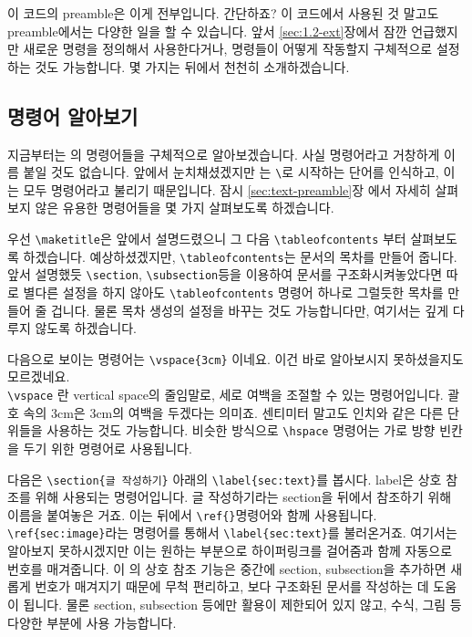 이 코드의 preamble은 이게 전부입니다. 간단하죠?
이 코드에서 사용된 것 말고도  preamble에서는 다양한 일을 할 수 있습니다.
앞서 \ref{sec:1.2-ext}장에서 잠깐 언급했지만 새로운 명령을 정의해서 사용한다거나, 명령들이 어떻게 작동할지 구체적으로 설정하는 것도 가능합니다.
몇 가지는 뒤에서 천천히 소개하겠습니다.


\subsection{명령어 알아보기}
\label{sec:text-cmd}
지금부터는 \lt 의 명령어들을 구체적으로 알아보겠습니다.
사실 명령어라고 거창하게 이름 붙일 것도 없습니다.
앞에서 눈치채셨겠지만 \lt 는 \verb|\|로 시작하는 단어를 인식하고, 이는 모두 명령어라고 불리기 때문입니다.
잠시 \ref{sec:text-preamble}장 에서 자세히 살펴보지 않은 유용한 \lt 명령어들을 몇 가지 살펴보도록 하겠습니다.

우선 \verb|\maketitle|은 앞에서 설명드렸으니 그 다음 \verb|\tableofcontents| 부터 살펴보도록 하겠습니다.
예상하셨겠지만, \verb|\tableofcontents|는 문서의 목차를 만들어 줍니다.
앞서 설명했듯 \verb|\section|, \verb|\subsection|등을 이용하여 문서를 구조화시켜놓았다면 따로 별다른 설정을 하지 않아도 \verb|\tableofcontents| 명령어 하나로 그럴듯한 목차를 만들어 줄 겁니다.
물론 목차 생성의 설정을 바꾸는 것도 가능합니다만, 여기서는 깊게 다루지 않도록 하겠습니다.

다음으로 보이는 명령어는 \verb|\vspace{3cm}| 이네요.
이건 바로 알아보시지 못하셨을지도 모르겠네요.\\
\verb|\vspace| 란 vertical space의 줄임말로, 세로 여백을 조절할 수 있는 명령어입니다.
괄호 속의 3cm은 3cm의 여백을 두겠다는 의미죠.
센티미터 말고도 인치와 같은 다른 단위들을 사용하는 것도 가능합니다.
비슷한 방식으로 \verb|\hspace| 명령어는 가로 방향 빈칸을 두기 위한 명령어로 사용됩니다.

다음은 \verb|\section{글 작성하기}| 아래의 \verb|\label{sec:text}|를 봅시다.
label은 상호 참조를 위해 사용되는 명령어입니다.
글 작성하기라는 section을 뒤에서 참조하기 위해 이름을 붙여놓은 거죠.
이는 뒤에서 \verb|\ref{}|명령어와 함께 사용됩니다.
\verb|\ref{sec:image}|라는 명령어를 통해서 \verb|\label{sec:text}|를 불러온거죠.
여기서는 알아보지 못하시겠지만 이는 원하는 부분으로 하이퍼링크를 걸어줌과 함께 자동으로 번호를 매겨줍니다.
이 \lt 의 상호 참조 기능은 중간에 section, subsection을 추가하면 새롭게 번호가 매겨지기 때문에 무척 편리하고, 보다 구조화된 문서를 작성하는 데 도움이 됩니다.
물론 section, subsection 등에만 활용이 제한되어 있지 않고, 수식, 그림 등 다양한 부분에 사용 가능합니다.

